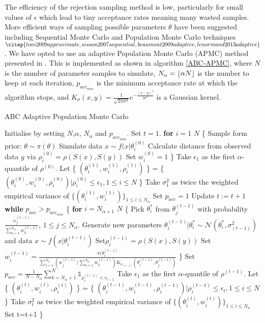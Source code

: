 \documentclass[twocolumn]{biophys}
\DeclarePairedDelimiter\floor{\lfloor}{\rfloor}
\begin{document}
The efficiency of the rejection sampling method is low, particularly for small values of $\epsilon$ which lead to tiny acceptance rates meaning many wasted samples. 
More efficient ways of sampling possible parameters $\theta$ have been suggested including Sequential Monte Carlo and Population Monte Carlo techniques $\citep{toni2009approximate, sisson2007sequential, beaumont2009adaptive, lenormand2013adaptive}$.
We have opted to use an adaptive Population Monte Carlo (APMC) method presented in \citet{lenormand2013adaptive}. 
This is implemented as shown in algorithm \ref{ABC-APMC}, where $N$ is the number of parameter samples to simulate, $N_{\alpha} = \floor{\alpha N}$ is the number to keep at each iteration, $p_{acc_{min}}$ is the minimum acceptance rate at which the algorithm stops,
and $K_{\sigma}(x,y) = \frac{1}{\sqrt{2\pi \sigma^2}} e^{-\frac{(x-y)^2}{2\sigma^2}}$ is a Gaussian kernel.
\begin{algorithm}
\caption{ABC Adaptive Population Monte Carlo}\label{ABC-APMC}
\begin{algorithmic}[1]
\State Initialise by setting $N$,$\alpha$, $N_{\alpha}$ and $p_{acc_{min}}$.
\State Set $t=1$.
\State \textbf{for} $i=1$  $N$  \{
\State Sample form prior: $\theta \sim \pi (\theta)$ 
\State Simulate data $x \sim f(x|\theta_i^{(0)}$
\State Calculate distance from observed data $y$ via $\rho_i^{(0)} = \rho(S(x),S(y))$
\State Set $w_i^{(0)} = 1$
\State \}
\State Take $\epsilon_1$ as the first $\alpha$-quantile of $\rho^{(0)}$.
\State Let \{ $(\theta_i^{(1)},w_i^{(1)}, \rho_i^{(1)})$ \} = \{ $(\theta_i^{(0)},w_i^{(0)}, \rho_i^{(0)}) | \rho_i^{(0)} \le \epsilon_1, 1 \le i \le N$ \} 
\State Take $\sigma_1^2$ as twice the weighted empirical variance of $\{(\theta_i^{(1)} ,w_i^(1)) \} _{1\le i \le N_{\alpha}}$
\State Set $p_{acc} = 1$
\State Update $t:=t+1$
\State \textbf{while} $p_{acc}>p_{acc_{min}}$ \{ 
\State \textbf{for} $i=N_{\alpha+1}$  $N$ \{
\State Pick $\theta_i^{*}$ from $\theta_j^{(t-1)}$ with probability $\frac{\omega_j^{(t-1)}}{\sum_{k=1}^{N_{\alpha}} w_k^{(t-1)}  }$, $1 \le j \le N_{\alpha}$.  
\State Generate new parameters $\theta_i^{(t-1)}|\theta_i^{*} \sim \mathcal{N} (\theta_i^{*}, \sigma_{(t-1)}^2)$ and data $x \sim f(x|\theta_i^{(t-1)})$
\State Set$ \rho_i^{(t-1)} = \rho (S(x),S(y))$
\State Set $w_i^{(t-1)} = \frac{\pi(\theta_i^{(t-1)}}{\sum_{j=1}^{N_{\alpha}}(w_j^{(t-1)}/\sum_{k=1}^{N_{\alpha}} w_k^{(t-1)}) K_{\sigma_{(t-1)}}(\theta_i^{(t-1)},\theta_j^{(t-1)}) }$
\State \}
\State Set $p_{acc} = \frac{1}{N-N_{\alpha}} \sum_{k=N_{\alpha}+1}^N \mathds{1}_{\rho_i^{(t-1)} < \epsilon_{t-1}}$
\State Take $\epsilon_1$ as the first $\alpha$-quantile of $\rho^{(t-1)}$.
\State Let \{ $(\theta_i^{(t)},w_i^{(t)}, \rho_i^{(t)})$ \} = \{ $(\theta_i^{(t-1)},w_i^{(t-1)}, \rho_i^{(t-1)}) | \rho_i^{(t-1)} \le \epsilon_t, 1 \le i \le N$ \} 
\State Take $\sigma_t^2$ as twice the weighted empirical variance of $\{(\theta_i^{(t)} ,w_i^(t)) \} _{1\le i \le N_{\alpha}}$
\State Set t=t+1
\State \}
\end{algorithmic}
\end{algorithm}
\end{document}
